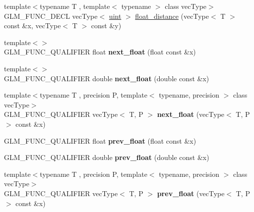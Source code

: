 \begin{DoxyCompactItemize}
\item 
{\footnotesize template$<$typename T , template$<$ typename $>$ class vec\+Type$>$ }\\G\+L\+M\+\_\+\+F\+U\+N\+C\+\_\+\+D\+E\+CL vec\+Type$<$ \hyperlink{group__core__precision_ga4fd29415871152bfb5abd588334147c8}{uint} $>$ \hyperlink{group__gtc__ulp_ga85355f2549d75789eb66e5d565d8ad26}{float\+\_\+distance} (vec\+Type$<$ T $>$ const \&x, vec\+Type$<$ T $>$ const \&y)
\item 
{\footnotesize template$<$$>$ }\\G\+L\+M\+\_\+\+F\+U\+N\+C\+\_\+\+Q\+U\+A\+L\+I\+F\+I\+ER float {\bfseries next\+\_\+float} (float const \&x)\hypertarget{namespaceglm_a094d145a4ae8efb9e42e88883cfb15f1}{}\label{namespaceglm_a094d145a4ae8efb9e42e88883cfb15f1}

\item 
{\footnotesize template$<$$>$ }\\G\+L\+M\+\_\+\+F\+U\+N\+C\+\_\+\+Q\+U\+A\+L\+I\+F\+I\+ER double {\bfseries next\+\_\+float} (double const \&x)\hypertarget{namespaceglm_a451149113e1a5083fcba0546de81ad51}{}\label{namespaceglm_a451149113e1a5083fcba0546de81ad51}

\item 
{\footnotesize template$<$typename T , precision P, template$<$ typename, precision $>$ class vec\+Type$>$ }\\G\+L\+M\+\_\+\+F\+U\+N\+C\+\_\+\+Q\+U\+A\+L\+I\+F\+I\+ER vec\+Type$<$ T, P $>$ {\bfseries next\+\_\+float} (vec\+Type$<$ T, P $>$ const \&x)\hypertarget{namespaceglm_a7e678a59e625a9453c8847e3d0e01625}{}\label{namespaceglm_a7e678a59e625a9453c8847e3d0e01625}

\item 
G\+L\+M\+\_\+\+F\+U\+N\+C\+\_\+\+Q\+U\+A\+L\+I\+F\+I\+ER float {\bfseries prev\+\_\+float} (float const \&x)\hypertarget{namespaceglm_a1fd407652d7ccfbe810674a2e5cbc8eb}{}\label{namespaceglm_a1fd407652d7ccfbe810674a2e5cbc8eb}

\item 
G\+L\+M\+\_\+\+F\+U\+N\+C\+\_\+\+Q\+U\+A\+L\+I\+F\+I\+ER double {\bfseries prev\+\_\+float} (double const \&x)\hypertarget{namespaceglm_a82cdd5674b80569f118b33a6a327c9bd}{}\label{namespaceglm_a82cdd5674b80569f118b33a6a327c9bd}

\item 
{\footnotesize template$<$typename T , precision P, template$<$ typename, precision $>$ class vec\+Type$>$ }\\G\+L\+M\+\_\+\+F\+U\+N\+C\+\_\+\+Q\+U\+A\+L\+I\+F\+I\+ER vec\+Type$<$ T, P $>$ {\bfseries prev\+\_\+float} (vec\+Type$<$ T, P $>$ const \&x)\hypertarget{namespaceglm_a90916626e6b0ed925938226f31b38c6b}{}\label{namespaceglm_a90916626e6b0ed925938226f31b38c6b}


\end{DoxyCompactItemize}
